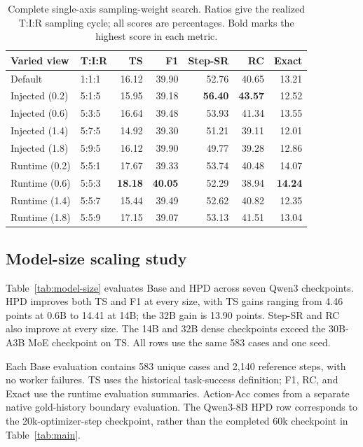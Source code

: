 \documentclass{article}
\begin{document}
\begin{table}[!htbp]
\centering
\small
\caption{Complete single-axis sampling-weight search. Ratios give the realized
T:I:R sampling cycle; all scores are percentages. Bold marks the highest score
in each metric.}
\label{tab:signal-density}
\begin{tabular}{@{}llrrrrr@{}}
\toprule
Varied view & T:I:R & TS & F1 & Step-SR & RC & Exact \\
\midrule
Default & 1:1:1 & 16.12 & 39.90 & 52.76 & 40.65 & 13.21 \\
\midrule
Injected (0.2) & 5:1:5 & 15.95 & 39.18 & \textbf{56.40} & \textbf{43.57} & 12.52 \\
Injected (0.6) & 5:3:5 & 16.64 & 39.48 & 53.93 & 41.34 & 13.55 \\
Injected (1.4) & 5:7:5 & 14.92 & 39.30 & 51.21 & 39.11 & 12.01 \\
Injected (1.8) & 5:9:5 & 16.12 & 39.90 & 49.77 & 39.28 & 12.86 \\
\midrule
Runtime (0.2) & 5:5:1 & 17.67 & 39.33 & 53.74 & 40.48 & 14.07 \\
Runtime (0.6) & 5:5:3 & \textbf{18.18} & \textbf{40.05} & 52.29 & 38.94 & \textbf{14.24} \\
Runtime (1.4) & 5:5:7 & 15.44 & 39.49 & 52.62 & 40.82 & 12.35 \\
Runtime (1.8) & 5:5:9 & 17.15 & 39.07 & 53.13 & 41.51 & 13.04 \\
\bottomrule
\end{tabular}
\end{table}
\endgroup
\FloatBarrier
{}
\subsection{Model-size scaling study}

Table~\ref{tab:model-size} evaluates Base and HPD across seven Qwen3
checkpoints. HPD improves both TS and F1 at every size, with TS gains
ranging from 4.46 points at 0.6B to 14.41 at 14B; the 32B gain is 13.90
points. Step-SR and RC also improve at every size. The 14B and 32B dense
checkpoints exceed the 30B-A3B MoE checkpoint on TS. All rows use the same
583 cases and one seed.

Each Base evaluation contains 583 unique cases and 2,140 reference steps,
with no worker failures. TS uses the historical task-success definition;
F1, RC, and Exact use the runtime evaluation summaries. Action-Acc comes
from a separate native gold-history boundary evaluation. The Qwen3-8B HPD row corresponds to the 20k-optimizer-step
checkpoint, rather than the completed 60k checkpoint in Table~\ref{tab:main}.
\end{document}
